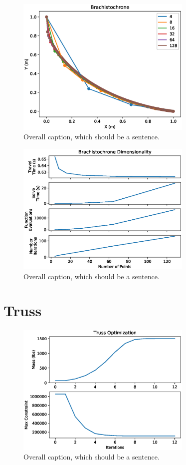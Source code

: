 \documentclass{article}
\begin{document}
\begin{figure}[htbp]
	\centering
	\includegraphics[width=0.75\textwidth]{figures/brachistrochrone.eps}
	\caption{Overall caption, which should be a sentence.}
	\label{fig:results}
\end{figure}

\begin{figure}[htbp]
	\centering
	\includegraphics[width=0.75\textwidth]{figures/dimensionality.eps}
	\caption{Overall caption, which should be a sentence.}
	\label{fig:dimensionality}
\end{figure}


\section{Truss}

\begin{figure}[htbp]
	\centering
	\includegraphics[width=0.75\textwidth]{figures/truss.eps}
	\caption{Overall caption, which should be a sentence.}
	\label{fig:truss}
\end{figure}
\end{document}

